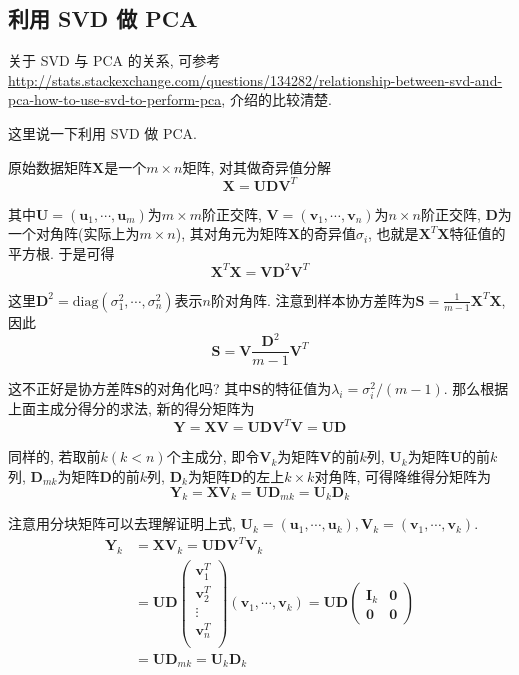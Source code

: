 \documentclass[a4paper,UTF8]{ctexart}
\theoremstyle{plain} \newtheorem{theorem}{定理}[section]
\theoremstyle{plain} \newtheorem{definition}{定义}[section]
\theoremstyle{plain} \newtheorem{lemma}{引理}[section]
\theoremstyle{plain} \newtheorem{proposition}{命题}[section]
\theoremstyle{plain} \newtheorem{example}{例}[section]
\theoremstyle{plain} \newtheorem{remark}{注}[section]
\theoremstyle{plain} \newtheorem{corollary}{推论}[section]
\begin{document}
\subsection{利用 SVD 做 PCA}
关于 SVD 与 PCA 的关系, 可参考 \url{http://stats.stackexchange.com/questions/134282/relationship-between-svd-and-pca-how-to-use-svd-to-perform-pca}, 介绍的比较清楚.

这里说一下利用 SVD 做 PCA.

原始数据矩阵$\bm{X}$是一个$m \times n$矩阵, 对其做奇异值分解
\begin{equation*}
\bm{X} = \bm{U} \bm{D} \bm{V}^{T}
\end{equation*}

其中$\bm{U} = (\bm{u}_1, \cdots, \bm{u}_m)$为$m \times m$阶正交阵, $\bm{V} = (\bm{v}_1, \cdots, \bm{v}_n)$为$n \times n$阶正交阵, $\bm{D}$为一个对角阵(实际上为$m \times n$), 其对角元为矩阵$\bm{X}$的奇异值$\sigma_i$, 也就是$\bm{X}^T \bm{X}$特征值的平方根. 于是可得
\begin{equation*}
\bm{X}^{T} \bm{X} = \bm{V} \bm{D}^2 \bm{V}^{T}
\end{equation*}

这里$\bm{D}^2 = \mathrm{diag}(\sigma_{1}^2, \cdots, \sigma_{n}^2)$表示$n$阶对角阵. 注意到样本协方差阵为$\bm{S} = \frac{1}{m - 1} \bm{X}^T \bm{X}$, 因此
\begin{equation*}
\bm{S} = \bm{V} \frac{\bm{D}^2}{m - 1} \bm{V}^{T}
\end{equation*}

这不正好是协方差阵$\bm{S}$的对角化吗? 其中$\bm{S}$的特征值为$\lambda_{i} = \sigma_{i}^2 / (m - 1)$. 那么根据上面主成分得分的求法, 新的得分矩阵为
\begin{equation*}
\bm{Y} = \bm{X} \bm{V} = \bm{U} \bm{D} \bm{V}^{T} \bm{V} = \bm{U} \bm{D}
\end{equation*}

同样的, 若取前$k(k < n)$个主成分, 即令$\bm{V}_k$为矩阵$\bm{V}$的前$k$列, $\bm{U}_k$为矩阵$\bm{U}$的前$k$列, $\bm{D}_{mk}$为矩阵$\bm{D}$的前$k$列, $\bm{D}_k$为矩阵$\bm{D}$的左上$k \times k$对角阵, 可得降维得分矩阵为
\begin{equation*}
\bm{Y}_k = \bm{X} \bm{V}_k = \bm{U} \bm{D}_{mk} = \bm{U}_k \bm{D}_k
\end{equation*}

注意用分块矩阵可以去理解证明上式, $\bm{U}_k = (\bm{u}_1, \cdots, \bm{u}_k), \bm{V}_k = (\bm{v}_1, \cdots, \bm{v}_k)$.
\begin{align*}
\bm{Y}_k & = \bm{X} \bm{V}_k = \bm{U} \bm{D} \bm{V}^{T} \bm{V}_k \\
& = \bm{U} \bm{D}
\begin{pmatrix}
\bm{v}_1^{T} \\ 
\bm{v}_2^{T} \\ 
\vdots \\ 
\bm{v}_n^{T} \\ 
\end{pmatrix}
(\bm{v}_1, \cdots, \bm{v}_k) = \bm{U} \bm{D} 
\begin{pmatrix}
\bm{I}_k &  \bm{0} \\ 
\bm{0}  &  \bm{0}
\end{pmatrix} \\ 
& = \bm{U} \bm{D}_{mk} = \bm{U}_k \bm{D}_k
\end{align*}
\end{document}

